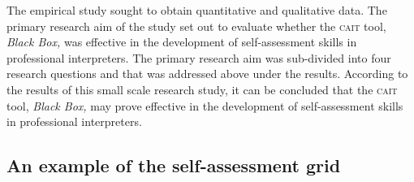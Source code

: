 \documentclass[output=paper]{langsci/langscibook}
\begin{document}
The empirical study sought to obtain quantitative and qualitative data. The primary research aim of the study set out to evaluate whether the \textsc{cait} tool, \textit{Black Box,} was effective in the development of self-assessment skills in professional interpreters. The primary research aim was sub-divided into four research questions and that was addressed above under the results. According to the results of this small scale research study, it can be concluded that the \textsc{cait} tool, \textit{Black Box,} may prove effective in the development of self-assessment skills in professional interpreters. 

\begin{paperappendix}
\section{An example of the self-assessment grid}
\label{03:addendum:A}
\renewcommand{\arraystretch}{2}
\newlength{\tablewidth}\setlength{\tablewidth}{20cm}
\newlength{\cellwidth}\setlength{\cellwidth}{0.033\tablewidth}
\newlength{\rowwidth}\setlength{\rowwidth}{30\cellwidth}

\end{paperappendix}
\end{document}
